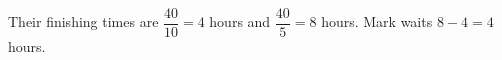 Their finishing times are $\dfrac{40}{10}=4$ hours and $\dfrac{40}{5}=8$ hours. Mark waits $8-4=\boxed4$ hours.
